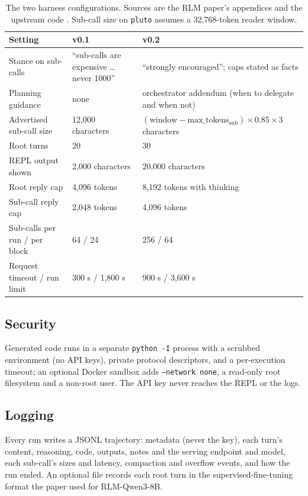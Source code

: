 \documentclass[11pt]{article}
\newcommand{\code}[1]{\texttt{#1}}
\begin{document}
\begin{table}[t]
\centering\small
\caption{The two harness configurations. Sources are the RLM paper's appendices
\citep{zhang2025rlm} and the upstream code \citep{rlmrepo}. Sub-call size on
\code{pluto} assumes a 32,768-token reader window.}
\label{tab:versions}
\begin{tabularx}{\linewidth}{lXX}
\toprule
Setting & v0.1 & v0.2 \\
\midrule
Stance on sub-calls & ``sub-calls are expensive \ldots{} never 1000'' & ``strongly encouraged''; caps stated as facts \\
Planning guidance & none & orchestrator addendum (when to delegate and when not) \\
Advertised sub-call size & 12,000 characters & $(\text{window} - \text{max\_tokens}_{\text{sub}}) \times 0.85 \times 3$ characters \\
Root turns & 20 & 30 \\
REPL output shown & 2,000 characters & 20,000 characters \\
Root reply cap & 4,096 tokens & 8,192 tokens with thinking \\
Sub-call reply cap & 2,048 tokens & 4,096 tokens \\
Sub-calls per run / per block & 64 / 24 & 256 / 64 \\
Request timeout / run limit & 300 s / 1,800 s & 900 s / 3,600 s \\
\bottomrule
\end{tabularx}
\end{table}

\subsection{Security}
Generated code runs in a separate \code{python -I} process with a scrubbed
environment (no API keys), private protocol descriptors, and a per-execution
timeout; an optional Docker sandbox adds \code{--network none}, a read-only root
filesystem and a non-root user. The API key never reaches the REPL or the logs.

\subsection{Logging}
Every run writes a JSONL trajectory: metadata (never the key), each turn's content,
reasoning, code, outputs, notes and the serving endpoint and model, each sub-call's
sizes and latency, compaction and overflow events, and how the run ended. An
optional file records each root turn in the supervised-fine-tuning format the paper
used for RLM-Qwen3-8B.
\end{document}
